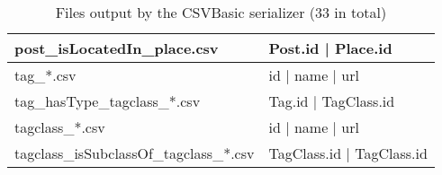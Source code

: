 \begin{table}[htb]
\begin{tabular}{|p{4.6cm}|p{9.8cm}|}
    	post\_isLocatedIn\_place.csv            & Post.id | Place.id                                                                      \\ \hline
    	tag\_*.csv                              & id | name | url                                                                         \\ \hline
    	tag\_hasType\_tagclass\_*.csv           & Tag.id | TagClass.id                                                                    \\ \hline
    	tagclass\_*.csv                         & id | name | url                                                                         \\ \hline
    	tagclass\_isSubclassOf\_tagclass\_*.csv & TagClass.id | TagClass.id                                                               \\ \hline
    \end{tabular}
    \caption{Files output by the CSVBasic serializer (33 in total)}
    \label{table:csv}
\end{table}
